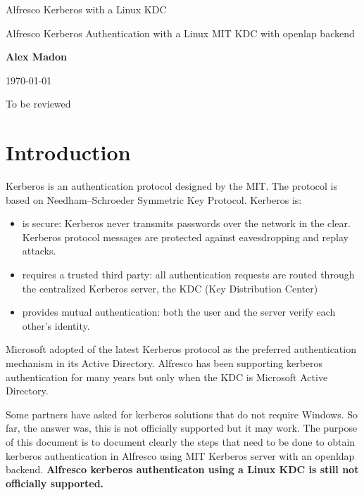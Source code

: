 \documentclass[12pt,a4]{article}
\begin{document}
\begin{center}
{\huge Alfresco Kerberos with a Linux KDC}

\vspace{5mm}

\Large{Alfresco Kerberos Authentication with a Linux MIT KDC with openlap backend}

\vspace{5mm}
{\bf Alex Madon}
\vspace{5mm}

\today

\vspace{15mm}
{\huge To be reviewed}

\end{center}
\vspace{5mm}

\newpage

\tableofcontents

\newpage

\section{Introduction}
Kerberos is an authentication protocol designed by the MIT. The protocol is based on Needham–Schroeder Symmetric Key Protocol. Kerberos is:
\begin{itemize}
\item is secure: Kerberos never transmits passwords over the network in the clear. Kerberos protocol messages are protected against eavesdropping and replay attacks.
\item requires a trusted third party: all authentication requests are routed through the centralized Kerberos server, the KDC (Key Distribution Center)
\item provides mutual authentication: both the user and the server verify each other's identity. 
\end{itemize}
Microsoft adopted of the latest Kerberos protocol as the preferred authentication mechanism in its Active Directory.
Alfresco has been supporting kerberos authentication for many years but only when the KDC is Microsoft Active Directory.

Some partners have asked for kerberos solutions that do not require Windows. So far, the answer was, this is not officially supported but it may work.
The purpose of this document is to document clearly the steps that need to be done  to obtain kerberos authentication in Alfresco using MIT Kerberos server with an openldap backend.
{\bf Alfresco kerberos authenticaton using a Linux KDC is still not officially supported.}
\end{document}
